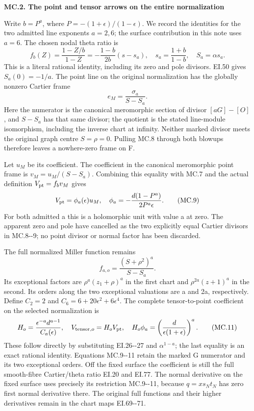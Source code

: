 \par

\medskip\noindent\textbf{MC.2. The point and tensor arrows on the entire normalization}

\par\nobreak

Write \(b=P^a\), where
\(P=-(1+\epsilon)/(1-\epsilon)\). We record the identities
for the two admitted line exponents \(a=2,6\); the surface
contribution in this note uses \(a=6\). The chosen nodal
theta ratio is
\[
 f_b(Z)=\frac{1-Z/b}{1-Z}
       =-\frac{1-b}{2b}(s-s_a),\quad
 s_a=\frac{1+b}{1-b},\quad S_a=\alpha s_a.               \tag{MC.7}
\]
This is a literal rational identity, including its zero and
pole divisors. EI.50 gives \(S_a(0)=-1/a\). The point line
on the original normalization has the globally nonzero
Cartier frame
\[
 e_M=\frac{\sigma_a}{S-S_a}.                            \tag{MC.8}
\]
Here the numerator is the canonical meromorphic section of
divisor \([aG]-[O]\), and \(S-S_a\) has that same divisor;
the quotient is the stated line-module isomorphism, including
the inverse chart at infinity. Neither marked divisor meets
the original graph centre \(S=\rho=0\). Pulling MC.8 through
both blowups therefore leaves a nowhere-zero frame on F.

Let \(u_M\) be its coefficient. The coefficient in the
canonical meromorphic point frame is
\(v_M=u_M/(S-S_a)\). Combining this equality with MC.7 and
the actual definition \(V_{\rm pt}=f_bv_M\) gives
\[
 V_{\rm pt}=\phi_a(\epsilon)u_M,
 \quad \phi_a=-\frac{d(1-P^a)}{2P^a\epsilon}.            \tag{MC.9}
\]
For both admitted a this is a holomorphic unit with value a
at zero. The apparent zero and pole have cancelled as the
two explicitly equal Cartier divisors in MC.8-\/-9; no point
divisor or normal factor has been discarded.

The full normalized Miller function remains
\[
 f_{a,o}=\frac{(S+\rho^2)^a}{S-S_a}.                    \tag{MC.10}
\]
Its exceptional factors are
\(\rho^a(z_1+\rho)^a\) in the first chart and
\(\rho^{2a}(z+1)^a\) in the second. Its orders along the
two exceptional valuations are a and 2a, respectively.
Define \(C_2=2\) and \(C_6=6+20\epsilon^2+6\epsilon^4\).
The complete tensor-to-point coefficient on the selected
normalization is
\[
 H_o=\frac{\epsilon^{-a}d^{a-1}}{C_a(\epsilon)},
 \quad V_{{\rm tensor},o}=H_o V_{\rm pt},
 \quad H_o\phi_a=
       \left(\frac{d}{\epsilon(1+\epsilon)}\right)^a.     \tag{MC.11}
\]
These follow directly by substituting EI.26-\/-27 and
\(\alpha^{1-a}\); the last equality is an exact rational
identity. Equations MC.9-\/-11 retain the marked G numerator
and its two exceptional orders. Off the fixed surface the
coefficient is still the full smooth-fibre Cartier/theta
ratio EI.20 and EI.77. The normal derivative on the fixed
surface uses precisely its restriction MC.9-\/-11, because
\(q=x s_Nt_N\) has zero first normal derivative there.
The original full functions and their higher derivatives
remain in the chart maps EI.69-\/-71.

